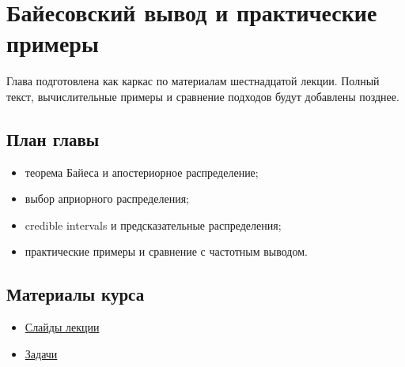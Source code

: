 \documentclass[
  russian,
  12pt,
  a4paper,
  a4paper,
  openany]{scrbook}
\providecommand{\tightlist}{%
  \setlength{\itemsep}{0pt}\setlength{\parskip}{0pt}}
\begin{document}
\chapter{Байесовский вывод и практические
примеры}\label{ux431ux430ux439ux435ux441ux43eux432ux441ux43aux438ux439-ux432ux44bux432ux43eux434-ux438-ux43fux440ux430ux43aux442ux438ux447ux435ux441ux43aux438ux435-ux43fux440ux438ux43cux435ux440ux44b}

\begin{bookchapteropening}

Глава подготовлена как каркас по материалам шестнадцатой лекции. Полный
текст, вычислительные примеры и сравнение подходов будут добавлены
позднее.

\end{bookchapteropening}

\section{План
главы}\label{ux43fux43bux430ux43d-ux433ux43bux430ux432ux44b-14}

\begin{itemize}
\tightlist
\item
  теорема Байеса и апостериорное распределение;
\item
  выбор априорного распределения;
\item
  credible intervals и предсказательные распределения;
\item
  практические примеры и сравнение с частотным выводом.
\end{itemize}

\section{Материалы
курса}\label{ux43cux430ux442ux435ux440ux438ux430ux43bux44b-ux43aux443ux440ux441ux430-13}

\begin{itemize}
\tightlist
\item
  \href{https://neutrinohit.github.io/statistical-analysis-course/ru/slides/15_bayesian_examples.html}{Слайды
  лекции}
\item
  \href{https://neutrinohit.github.io/statistical-analysis-course/ru/slides/exercises/15_bayesian_examples_exercises.html}{Задачи}
\end{itemize}


\backmatter
\end{document}
